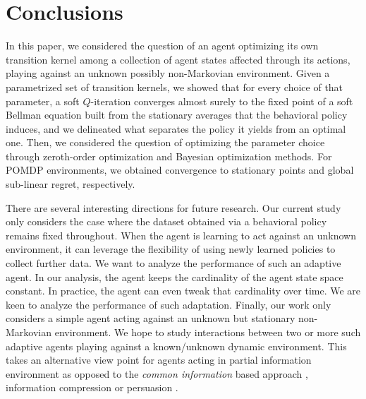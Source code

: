 \documentclass[12pt]{article}
\renewcommand{\[}{\left[}
\renewcommand{\]}{\right]}
\renewcommand{\(}{\left(}
\renewcommand{\)}{\right)}
\newcounter{l1}
\newcounter{l2}
\newcounter{l3}
\begin{document}
\section{Conclusions}
\label{sec:conclusion}
In this paper, we considered the question of an agent optimizing its own transition kernel among a collection of agent states affected through its actions, playing against an unknown possibly non-Markovian environment. Given a parametrized set of transition kernels, we showed that for every choice of that parameter, a soft $Q$-iteration converges almost surely to the fixed point of a soft Bellman equation built from the stationary averages that the behavioral policy induces, and we delineated what separates the policy it yields from an optimal one. Then, we considered the question of optimizing the parameter choice through zeroth-order optimization and Bayesian optimization methods. For POMDP environments, we obtained convergence to stationary points and global sub-linear regret, respectively.

There are several interesting directions for future research. Our current study only considers the case where the dataset obtained via a behavioral policy remains fixed throughout. When the agent is learning to act against an unknown environment, it can leverage the flexibility of using newly learned policies to collect further data. We want to analyze the performance of such an adaptive agent. In our analysis, the agent keeps the cardinality of the agent state space constant. In practice, the agent can even tweak that cardinality over time. We are keen to analyze the performance of such adaptation. Finally, our work only considers a simple agent acting against an unknown but stationary non-Markovian environment. We hope to study interactions between two or more such adaptive agents playing against a known/unknown dynamic environment. This takes an alternative view point for agents acting in partial information environment as opposed to the \emph{common information} based approach \cite{nayyar2013common}, information compression \cite{mao2020information} or persuasion \cite{velicheti2025value, velicheti2023strategic, velicheti2024learning, velicheti2025harnessing, velichetilearning}.







\end{document}
